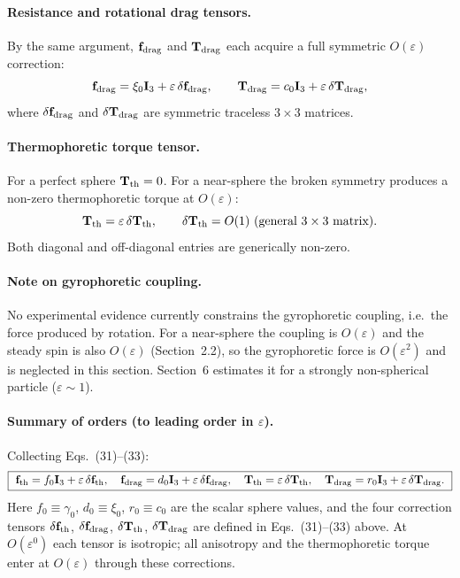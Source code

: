\documentclass[11pt]{article}
\newcommand{\chg}[1]{\marginpar{\raggedright\footnotesize\textcolor{red!70!black}{\textsf{#1}}}}
\begin{document}
\paragraph{Resistance and rotational drag tensors.} By the same argument, $\mathbf f_{\rm drag}$ and $\mathbf T_{\rm drag}$ each acquire a full symmetric $O(\varepsilon)$ correction:
\begin{equation}
  \mathbf f_{\rm drag}=\xi_0\mathbf I_3+\varepsilon\,\delta\mathbf f_{\rm drag},\qquad
  \mathbf T_{\rm drag}=c_0\mathbf I_3+\varepsilon\,\delta\mathbf T_{\rm drag},
\end{equation}
where $\delta\mathbf f_{\rm drag}$ and $\delta\mathbf T_{\rm drag}$ are symmetric traceless $3\times3$ matrices.

\paragraph{Thermophoretic torque tensor.} For a perfect sphere $\mathbf T_{\rm th}=0$. For a near-sphere the broken symmetry produces a non-zero thermophoretic torque at $O(\varepsilon)$:
\begin{equation}
  \mathbf T_{\rm th}=\varepsilon\,\delta\mathbf T_{\rm th},\qquad \delta\mathbf T_{\rm th}=O(1)\ \text{(general $3\times3$ matrix)}.
\end{equation}
Both diagonal and off-diagonal entries are generically non-zero.

\paragraph{Note on gyrophoretic coupling.}\chg{C10} No experimental evidence currently constrains the gyrophoretic coupling, i.e.\ the force produced by rotation. For a near-sphere the coupling is $O(\varepsilon)$ and the steady spin is also $O(\varepsilon)$ (Section~2.2), so the gyrophoretic force is $O(\varepsilon^2)$ and is neglected in this section. Section~6 estimates it for a strongly non-spherical particle ($\varepsilon\sim1$).

\paragraph{Summary of orders (to leading order in $\varepsilon$).} Collecting Eqs.~(31)--(33):
\begin{equation}
  \boxed{\ \mathbf f_{\rm th}=f_0\mathbf I_3+\varepsilon\,\delta\mathbf f_{\rm th},\quad
  \mathbf f_{\rm drag}=d_0\mathbf I_3+\varepsilon\,\delta\mathbf f_{\rm drag},\quad
  \mathbf T_{\rm th}=\varepsilon\,\delta\mathbf T_{\rm th},\quad
  \mathbf T_{\rm drag}=r_0\mathbf I_3+\varepsilon\,\delta\mathbf T_{\rm drag}.\ }
\end{equation}
Here $f_0\equiv\gamma_0$, $d_0\equiv\xi_0$, $r_0\equiv c_0$ are the scalar sphere values, and the four correction tensors $\delta\mathbf f_{\rm th}$, $\delta\mathbf f_{\rm drag}$, $\delta\mathbf T_{\rm th}$, $\delta\mathbf T_{\rm drag}$ are defined in Eqs.~(31)--(33) above. At $O(\varepsilon^0)$ each tensor is isotropic; all anisotropy and the thermophoretic torque enter at $O(\varepsilon)$ through these corrections.
\end{document}
